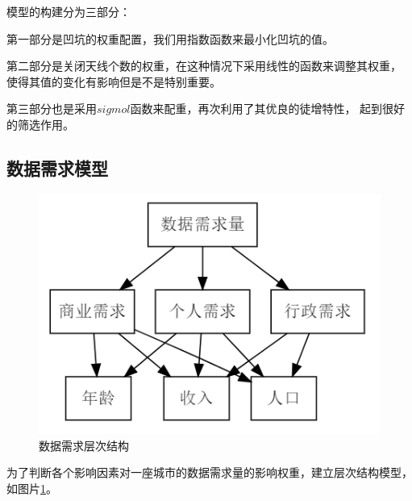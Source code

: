 \documentclass[UTF8,12pt]{ctexart}
\begin{document}
        \noindent 模型的构建分为三部分：\par
        第一部分是凹坑的权重配置，我们用指数函数来最小化凹坑的值。\par
        第二部分是关闭天线个数的权重，在这种情况下采用线性的函数来调整其权重，
        使得其值的变化有影响但是不是特别重要。\par
        第三部分也是采用$sigmol$函数来配重，再次利用了其优良的徒增特性，
        起到很好的筛选作用。

    \subsection{数据需求模型}\label{ShuJv}
            \begin{figure}[H]
                    \centering
                    \includegraphics{need.png}
                    \caption{数据需求层次结构}\label{SJXQCCJG}
                \end{figure}
        为了判断各个影响因素对一座城市的数据需求量的影响权重，建立层次结构模型，如图片\ref{SJXQCCJG}。
\end{document}
